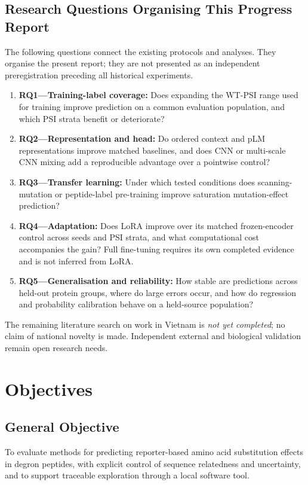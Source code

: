 \subsection{Research Questions Organising This Progress Report}
The following questions connect the existing protocols and analyses. They organise the present
report; they are not presented as an independent preregistration preceding all historical experiments.
\begin{enumerate}
  \item \textbf{RQ1---Training-label coverage:} Does expanding the WT-PSI range used for training improve
        prediction on a common evaluation population, and which PSI strata benefit or deteriorate?
  \item \textbf{RQ2---Representation and head:} Do ordered context and pLM representations improve
        matched baselines, and does CNN or multi-scale CNN mixing add a reproducible advantage over
        a pointwise control?
  \item \textbf{RQ3---Transfer learning:} Under which tested conditions does scanning-mutation or
        peptide-label pre-training improve saturation mutation-effect prediction?
  \item \textbf{RQ4---Adaptation:} Does LoRA improve over its matched frozen-encoder control across
        seeds and PSI strata, and what computational cost accompanies the gain? Full fine-tuning
        requires its own completed evidence and is not inferred from LoRA.
  \item \textbf{RQ5---Generalisation and reliability:} How stable are predictions across held-out protein
        groups, where do large errors occur, and how do regression and probability calibration behave
        on a held-source population?
\end{enumerate}
The remaining literature search on work in Vietnam is \emph{not yet completed}; no claim of national
novelty is made. Independent external and biological validation remain open research needs.

\section{Objectives}
\subsection{General Objective}
To evaluate methods for predicting reporter-based amino acid substitution effects in degron peptides,
with explicit control of sequence relatedness and uncertainty, and to support traceable exploration
through a local software tool.

